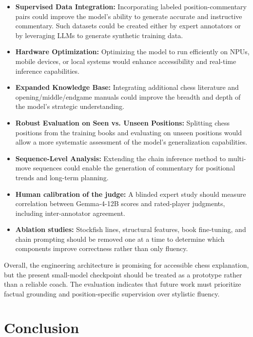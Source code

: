 \documentclass[sigconf,nonacm]{acmart}
\begin{document}
\begin{itemize}
    \item \textbf{Supervised Data Integration:} Incorporating labeled position-commentary pairs could improve the model's ability to generate accurate and instructive commentary. Such datasets could be created either by expert annotators or by leveraging LLMs to generate synthetic training data.
    \item \textbf{Hardware Optimization:} Optimizing the model to run efficiently on NPUs, mobile devices, or local systems would enhance accessibility and real-time inference capabilities.
    \item \textbf{Expanded Knowledge Base:} Integrating additional chess literature and opening/middle/endgame manuals could improve the breadth and depth of the model’s strategic understanding.
    \item \textbf{Robust Evaluation on Seen vs. Unseen Positions:} Splitting chess positions from the training books and evaluating on unseen positions would allow a more systematic assessment of the model’s generalization capabilities.
    \item \textbf{Sequence-Level Analysis:} Extending the chain inference method to multi-move sequences could enable the generation of commentary for positional trends and long-term planning.
    \item \textbf{Human calibration of the judge:} A blinded expert study should measure correlation between Gemma-4-12B scores and rated-player judgments, including inter-annotator agreement.
    \item \textbf{Ablation studies:} Stockfish lines, structural features, book fine-tuning, and chain prompting should be removed one at a time to determine which components improve correctness rather than only fluency.
\end{itemize}

Overall, the engineering architecture is promising for accessible chess explanation, but the present small-model checkpoint should be treated as a prototype rather than a reliable coach. The evaluation indicates that future work must prioritize factual grounding and position-specific supervision over stylistic fluency.


\section{Conclusion}
\label{sec:conclusion}
\end{document}
